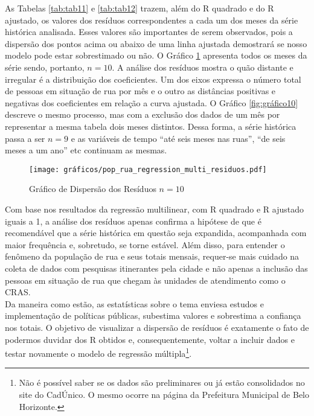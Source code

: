 \documentclass[12pt]{article}
\begin{document}
As Tabelas \ref{tab:tab11} e \ref{tab:tab12} trazem, além do R quadrado e do R ajustado, os valores dos resíduos correspondentes a cada um dos meses da série histórica analisada. Esses valores são importantes de serem observados, pois a dispersão dos pontos acima ou abaixo de uma linha ajustada demostrará se nosso modelo pode estar sobrestimado ou não. O Gráfico \ref{fig:gráfico9} apresenta todos os meses da série sendo, portanto,  $n = 10$. A análise dos resíduos mostra o quão distante e irregular é a distribuição dos coeficientes. Um dos eixos expressa o número total de pessoas em situação de rua por mês e o outro as distâncias positivas e negativas dos coeficientes em relação a curva ajustada. O Gráfico \ref{fig:gráfico10} descreve o mesmo processo, mas com a exclusão dos dados de um mês por representar a mesma tabela dois meses distintos. Dessa forma, a série histórica passa a ser  $n = 9$ e as variáveis de tempo ``até seis meses nas ruas”, ``de seis meses a um ano” etc continuam as mesmas.\\

\begin{figure}[H]
\centering
	\caption{Gráfico de Dispersão dos Resíduos  $n = 10$}
	\texttt{[image: gráficos/pop\_rua\_regression\_multi\_residuos.pdf]}
	 \label{fig:gráfico9}%
\end{figure}

Com base nos resultados da regressão multilinear, com R quadrado e R ajustado iguais a 1, a análise dos resíduos apenas confirma a hipótese de que é recomendável que a série histórica em questão seja expandida, acompanhada com maior frequência e, sobretudo, se torne estável. Além disso, para entender o fenômeno da população de rua e seus totais mensais, requer-se mais cuidado na coleta de dados com pesquisas itinerantes pela cidade e não apenas a inclusão das pessoas em situação de rua que chegam às unidades de atendimento como o CRAS.\\

Da maneira como estão, as estatísticas sobre o tema enviesa estudos e implementação de políticas públicas, subestima valores e sobrestima a confiança nos totais. O objetivo de visualizar a dispersão de resíduos é exatamente o fato de podermos duvidar dos R obtidos e, consequentemente, voltar a incluir dados e testar novamente o modelo de regressão múltipla\footnote{Não é possível saber se os dados são preliminares ou já estão consolidados no site do CadÚnico. O mesmo ocorre na página da Prefeitura Municipal de Belo Horizonte.}.\\
\end{document}
